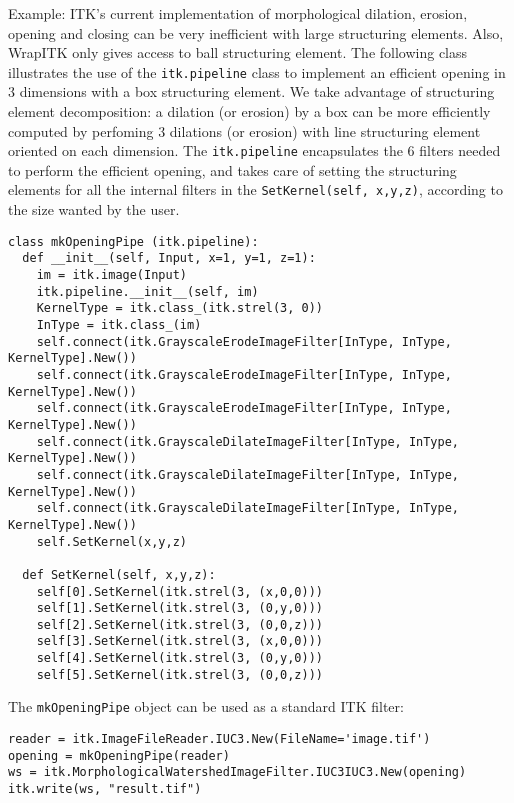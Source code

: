 \documentclass{InsightArticle}
\begin{document}
\begin{itemize}
\begin{itemize}
\end{itemize}

Example:
ITK's current implementation of morphological dilation, erosion, opening and closing
can be very inefficient with large structuring elements. Also, WrapITK only gives
access to ball structuring element. The following class illustrates the use of the 
\verb$itk.pipeline$ class to implement an efficient opening in 3 dimensions with
a box structuring element. We take advantage of structuring element decomposition:
a dilation (or erosion) by a box can be more efficiently computed by perfoming
3 dilations (or erosion) with line structuring element oriented on each dimension.
The \verb$itk.pipeline$ encapsulates the 6 filters needed to perform the efficient
opening, and takes care of setting the structuring elements for all the internal
filters in the \verb$SetKernel(self, x,y,z)$, according to the size wanted by the
user.

\begin{verbatim}
class mkOpeningPipe (itk.pipeline):
  def __init__(self, Input, x=1, y=1, z=1):
    im = itk.image(Input)
    itk.pipeline.__init__(self, im)
    KernelType = itk.class_(itk.strel(3, 0))
    InType = itk.class_(im)
    self.connect(itk.GrayscaleErodeImageFilter[InType, InType, KernelType].New())
    self.connect(itk.GrayscaleErodeImageFilter[InType, InType, KernelType].New())
    self.connect(itk.GrayscaleErodeImageFilter[InType, InType, KernelType].New())
    self.connect(itk.GrayscaleDilateImageFilter[InType, InType, KernelType].New())
    self.connect(itk.GrayscaleDilateImageFilter[InType, InType, KernelType].New())
    self.connect(itk.GrayscaleDilateImageFilter[InType, InType, KernelType].New())
    self.SetKernel(x,y,z)
 
  def SetKernel(self, x,y,z):
    self[0].SetKernel(itk.strel(3, (x,0,0)))
    self[1].SetKernel(itk.strel(3, (0,y,0)))
    self[2].SetKernel(itk.strel(3, (0,0,z)))
    self[3].SetKernel(itk.strel(3, (x,0,0)))
    self[4].SetKernel(itk.strel(3, (0,y,0)))
    self[5].SetKernel(itk.strel(3, (0,0,z)))
\end{verbatim}

The \verb$mkOpeningPipe$ object can be used as a standard ITK filter:

\begin{verbatim}
reader = itk.ImageFileReader.IUC3.New(FileName='image.tif')
opening = mkOpeningPipe(reader)
ws = itk.MorphologicalWatershedImageFilter.IUC3IUC3.New(opening)
itk.write(ws, "result.tif")
\end{verbatim}

\end{itemize}
\end{document}
